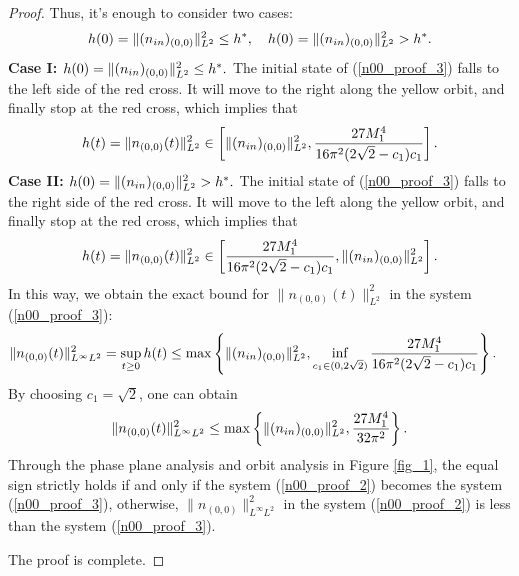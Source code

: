 \documentclass[12pt, reqno]{amsart}
\numberwithin{equation}{section}
\begin{document}
\begin{proof}
		Thus, it's enough to consider two cases:
		\begin{align*}
			h(0)=\|(n_{\rm in})_{(0,0)}\|^2_{L^2}\leq h^*,\quad 
			h(0)=\|(n_{\rm in})_{(0,0)}\|^2_{L^2}>h^*.	
		\end{align*}
		{\bf Case I: $h(0)=\|(n_{\rm in})_{(0,0)}\|^2_{L^2}\leq h^*.$} The initial state of (\ref{n00_proof_3}) falls to the left side of the red cross. It will move to the right along the yellow orbit, and finally stop at the red cross, which implies that
		$$h(t)=\|n_{(0,0)}(t)\|^2_{L^2}\in\left[\|(n_{\rm in})_{(0,0)}\|^2_{L^2}, \frac{27M_1^4}{16\pi^2(2\sqrt{2}-c_1)c_1}\right].$$
		{\bf Case II: $h(0)=\|(n_{\rm in})_{(0,0)}\|^2_{L^2}> h^*.$}  The initial state of (\ref{n00_proof_3}) falls to the right side of the red cross. It will move to the left along the yellow orbit, and finally stop at the red cross, which implies that
		$$h(t)=\|n_{(0,0)}(t)\|^2_{L^2}\in\left[\frac{27M_1^4}{16\pi^2(2\sqrt{2}-c_1)c_1},\|(n_{\rm in})_{(0,0)}\|^2_{L^2}\right].$$
		In this way, we obtain the exact bound for $\|n_{(0,0)}(t)\|^2_{L^2}$ in the system (\ref{n00_proof_3}):
		\begin{align*}
			\|n_{(0,0)}(t)\|^2_{L^{\infty}L^2}
			=\sup_{t\geq0}h(t)&\leq \max\left\{
			\|(n_{\rm in})_{(0,0)}\|^2_{L^2},
			\inf_{c_1\in(0,2\sqrt{2})}\frac{27M_1^4}{16\pi^2(2\sqrt{2}-c_1)c_1}\right\}.
		\end{align*}
		By choosing $c_1=\sqrt{2}$, one can obtain 
		\begin{align*}
			\|n_{(0,0)}(t)\|^2_{L^{\infty}L^2}\leq \max\left\{\|(n_{\rm in})_{(0,0)}\|^2_{L^2},\frac{27M_1^4}{32\pi^2}\right\}.
		\end{align*}
		Through the phase plane analysis and orbit analysis in Figure \ref{fig_1},
		the equal sign strictly holds if and only if the system (\ref{n00_proof_2}) becomes the system (\ref{n00_proof_3}), otherwise, $\|n_{(0,0)}\|^2_{L^{\infty}L^2}$ in the system  (\ref{n00_proof_2}) is less than the system  (\ref{n00_proof_3}).
		
		The proof is complete.
	\end{proof}
	
\end{document}
